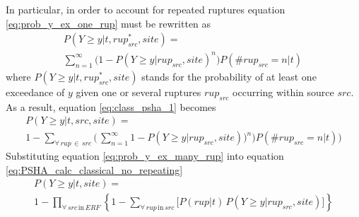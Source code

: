In particular, in order to account for repeated ruptures equation 
\ref{eq:prob_y_ex_one_rup} must be rewritten as 
\begin{multline}
P(Y \geq y|t,rup_{src}^{*},site) = \\
	\sum\limits_{n=1}^{\infty}
	\bigl( {1 - P(Y\geq y|rup_{src},site)^{n}}\bigr)
	P(\#rup_{src}=n|t)\,
\label{eq:prob_y_ex_many_rup}
\end{multline}
where $P(Y \geq y|t,rup_{src}^*,site)$ stands for the 
probability of at least one exceedance of $y$ given one or several 
ruptures $rup_{src}$ occurring within source $src$.
% 
As a result, equation \ref{eq:class_psha_1} becomes 
\begin{multline}
P(Y \geq y|t,src,site) = \\
1 - \sum_{\forall\,rup\,\in\,src}^{} 
	\biggl(\,
	\sum\limits_{n=1}^{\infty}
	1 - P(Y\geq y|rup_{src},site))^{n}\bigr)
	P(\#rup_{src}=n|t)
	\biggr)
\end{multline}
%
Substituting equation \ref{eq:prob_y_ex_many_rup} into equation 
\ref{eq:PSHA_calc_classical_no_repeating}
\begin{multline}
P(Y \geq y|t,site) = \\
	1-\prod\limits_{\forall\,src\,\text{in}\,ERF}^{}
	\left\{
		1-\sum\limits_{\forall\,rup\,\text{in}\,src}^{} 
			\biggl[ P(rup|t)\,P(Y\geq y|rup_{src},site)
			\biggr]
	\right\}
\end{multline}
